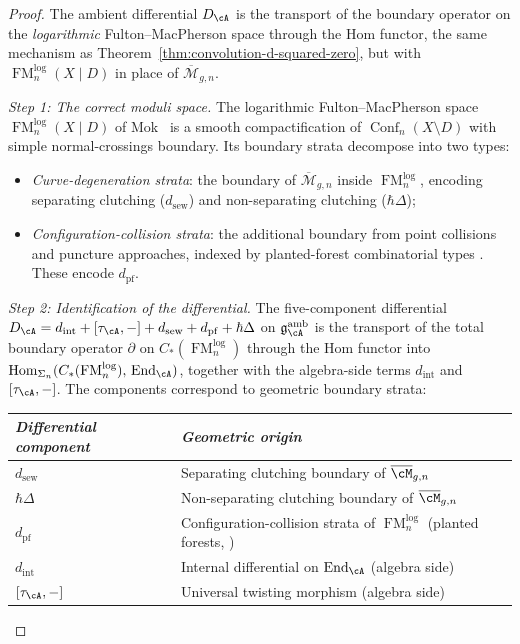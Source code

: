 \begin{proof}
The ambient differential $D_{\cA}$ is
the transport of the boundary operator on the \emph{logarithmic}
Fulton--MacPherson space through the Hom functor, the same
mechanism as Theorem~\ref{thm:convolution-d-squared-zero}, but
with $\operatorname{FM}_n^{\mathrm{log}}(X \mathbin{|} D)$ in
place of $\overline{\mathcal{M}}_{g,n}$.

\medskip
\emph{Step 1: The correct moduli space.}
The logarithmic Fulton--MacPherson space
$\operatorname{FM}_n^{\mathrm{log}}(X \mathbin{|} D)$ of
Mok~\cite[Theorem~3.3.1]{Mok25} is a smooth compactification of
$\operatorname{Conf}_n(X \setminus D)$ with simple normal-crossings
boundary.  Its boundary strata decompose into two types:
\begin{itemize}
\item \emph{Curve-degeneration strata}: the boundary of
  $\overline{\mathcal{M}}_{g,n}$ inside
  $\operatorname{FM}_n^{\mathrm{log}}$, encoding
  separating clutching ($d_{\mathrm{sew}}$) and non-separating
  clutching ($\hbar\Delta$);
\item \emph{Configuration-collision strata}: the additional boundary
  from point collisions and puncture approaches, indexed by
  planted-forest combinatorial types
  \cite[Theorem~3.3.1(2)]{Mok25}.  These encode
  $d_{\mathrm{pf}}$.
\end{itemize}

\medskip
\emph{Step 2: Identification of the differential.}
The five-component differential
$D_{\cA} = d_{\mathrm{int}} + [\tau_{\cA},-] + d_{\mathrm{sew}}
+ d_{\mathrm{pf}} + \hbar\Delta$
on $\mathfrak{g}^{\mathrm{amb}}_{\cA}$ is the transport of the
total boundary operator $\partial$ on
$C_*(\operatorname{FM}_n^{\mathrm{log}})$ through the Hom functor
into $\operatorname{Hom}_{\Sigma_n}(C_*(\operatorname{FM}_n^{\mathrm{log}}),\,
\operatorname{End}_{\cA})$,
together with the algebra-side terms $d_{\mathrm{int}}$ and
$[\tau_{\cA},-]$.  The components correspond to geometric boundary
strata:
\begin{center}
\renewcommand{\arraystretch}{1.2}
\begin{tabular}{ll}
\emph{Differential component} & \emph{Geometric origin} \\
\hline
$d_{\mathrm{sew}}$ & Separating clutching boundary of $\overline{\cM}_{g,n}$ \\
$\hbar\Delta$ & Non-separating clutching boundary of $\overline{\cM}_{g,n}$ \\
$d_{\mathrm{pf}}$ & Configuration-collision strata of $\operatorname{FM}_n^{\mathrm{log}}$
  \textup{(}planted forests, \cite[Thm~3.3.1(2)]{Mok25}\textup{)} \\
$d_{\mathrm{int}}$ & Internal differential on $\operatorname{End}_{\cA}$
  \textup{(}algebra side\textup{)} \\
$[\tau_{\cA},-]$ & Universal twisting morphism
  \textup{(}algebra side\textup{)}
\end{tabular}
\end{center}


\end{proof}
